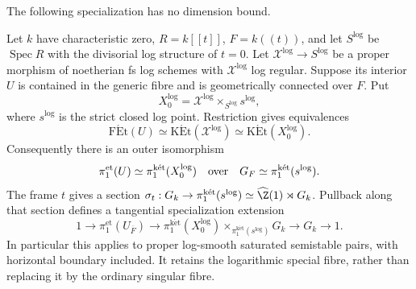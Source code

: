 The following specialization has no dimension bound.

\begin{theorem}\label{A6-log-specialization}
Let $k$ have characteristic zero, $R=k[[t]]$, $F=k((t))$, and let $S^{\log}$ be $\operatorname{Spec}R$ with the divisorial log structure of $t=0$. Let $\mathcal X^{\log}\to S^{\log}$ be a proper morphism of noetherian fs log schemes with $\mathcal X^{\log}$ log regular. Suppose its interior $U$ is contained in the generic fibre and is geometrically connected over $F$. Put
\[
 X_0^{\log}=\mathcal X^{\log}\times_{S^{\log}}s^{\log},
\]
where $s^{\log}$ is the strict closed log point. Restriction gives equivalences
\[
 \operatorname{F\acute Et}(U)
 \simeq\operatorname{K\acute Et}(\mathcal X^{\log})
 \simeq\operatorname{K\acute Et}(X_0^{\log}).
\]
Consequently there is an outer isomorphism
\[
 \pi_1^{\mathrm{et}}(U)\simeq
 \pi_1^{\mathrm{k\acute et}}(X_0^{\log})
 \quad\hbox{over}\quad
 G_F\simeq\pi_1^{\mathrm{k\acute et}}(s^{\log}).
\]
The frame $t$ gives a section
$\sigma_t:G_k\to\pi_1^{\mathrm{k\acute et}}(s^{\log})
\simeq\widehat{\Z}(1)\rtimes G_k$. Pullback along that section defines a tangential specialization extension
\[
 1\longrightarrow\pi_1^{\mathrm{et}}(U_{\overline{F}})
 \longrightarrow
 \pi_1^{\mathrm{k\acute et}}(X_0^{\log})
       \times_{\pi_1^{\mathrm{k\acute et}}(s^{\log})}G_k
 \longrightarrow G_k\longrightarrow1.
\]
In particular this applies to proper log-smooth saturated semistable pairs, with horizontal boundary included. It retains the logarithmic special fibre, rather than replacing it by the ordinary singular fibre.
\end{theorem}
